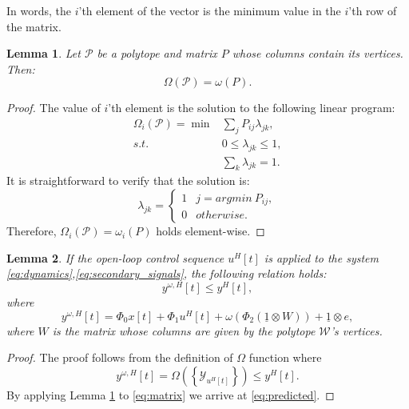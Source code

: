 \documentclass[letterpaper, 10 pt, conference]{ieeeconf}
\newtheorem{lemma}{Lemma}
\begin{document}
In words, the $i$'th element of the vector is the minimum value in the $i$'th row of the matrix. 
\begin{lemma}
\label{lemma:omega}
Let $\mathcal{P}$ be a polytope and matrix $P$ whose columns contain its vertices. Then:
\begin{equation}
\label{eq:omega_equal}
\Omega(\mathcal{P})=\omega(P).
\end{equation}
\end{lemma}
\begin{proof}
The value of $i$'th element is the solution to the following linear program: 
\begin{equation*}
\begin{array}{cl}
\Omega_i(\mathcal{P})=\min & \sum\limits_{j} P_{ij} \lambda_{jk}, \\
s.t.&0\le\lambda_{jk} \le1,\\
&  \sum\limits_{k} \lambda_{jk} =1.
\end{array}
\end{equation*}
It is straightforward to verify that the solution is:
\begin{equation*}
\lambda_{jk}= \left \{ 
\begin{array}{ll}
1 & j= argmin~ P_{ij}, \\
0 & otherwise.
\end{array}
  \right. 
\end{equation*}
Therefore, $\Omega_i(\mathcal{P})=\omega_i(P)$ holds element-wise. 
\end{proof}






\begin{lemma}
\label{lemma_secondary}
If the open-loop control sequence $u^H[t]$ is applied to the system \eqref{eq:dynamics},\eqref{eq:secondary_signals}, the following relation holds:
\begin{equation}
y^{\omega,H}[t] \le y^H[t],
\end{equation}
where
\begin{equation}
\label{eq:predicted}
y^{\omega,H}[t]= \Phi_0 x[t]+\Phi_1 u^H[t]+ \omega\left(\Phi_2 (\underline{1}\otimes W)\right)+\underline{1}\otimes e,
\end{equation}
where $W$ is the matrix whose columns are given by the polytope $\mathcal{W}$'s vertices. 
\end{lemma}
\begin{proof}
The proof follows from the definition of $\Omega$ function where
\begin{equation}
y^{\omega,H}[t]= \Omega \left (\left\{ \mathcal{Y}_{u^H[t]} \right\} \right) \le y^H[t].
\end{equation}
By applying Lemma \ref{lemma:omega} to \eqref{eq:matrix} we arrive at \eqref{eq:predicted}.
\end{proof}
\end{document}
